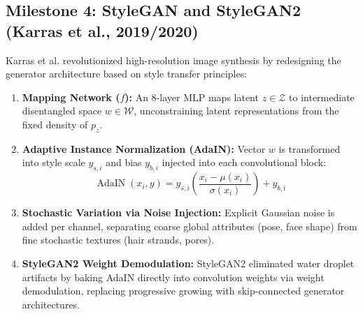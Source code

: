 \documentclass[conference]{IEEEtran}
\begin{document}
\subsection{Milestone 4: StyleGAN and StyleGAN2 (Karras et al., 2019/2020)}
Karras et al. \cite{karras2019style, karras2020analyzing} revolutionized high-resolution image synthesis by redesigning the generator architecture based on style transfer principles:
\begin{enumerate}
    \item \textbf{Mapping Network ($f$):} An 8-layer MLP maps latent $z \in \mathcal{Z}$ to intermediate disentangled space $w \in \mathcal{W}$, unconstraining latent representations from the fixed density of $p_z$.
    \item \textbf{Adaptive Instance Normalization (AdaIN):} Vector $w$ is transformed into style scale $y_{s,i}$ and bias $y_{b,i}$ injected into each convolutional block:
    \begin{equation}
    \operatorname{AdaIN}(x_i, y) = y_{s,i} \left( \frac{x_i - \mu(x_i)}{\sigma(x_i)} \right) + y_{b,i}
    \end{equation}
    \item \textbf{Stochastic Variation via Noise Injection:} Explicit Gaussian noise is added per channel, separating coarse global attributes (pose, face shape) from fine stochastic textures (hair strands, pores).
    \item \textbf{StyleGAN2 Weight Demodulation:} StyleGAN2 eliminated water droplet artifacts by baking AdaIN directly into convolution weights via weight demodulation, replacing progressive growing with skip-connected generator architectures.
\end{enumerate}
\end{document}
